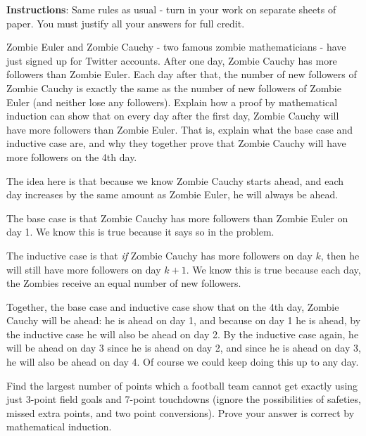 \documentclass[11pt]{exam}
\begin{document}
\noindent \textbf{Instructions}: Same rules as usual - turn in your work on separate sheets of paper.  You must justify all your answers for full credit.

\begin{questions}
\question[6] Zombie Euler and Zombie Cauchy - two famous zombie mathematicians - have just signed up for Twitter accounts.  After one day, Zombie Cauchy has more followers than Zombie Euler.  Each day after that, the number of new followers of Zombie Cauchy is exactly the same as the number of new followers of Zombie Euler (and neither lose any followers).  Explain how a proof by mathematical induction can show that on every day after the first day, Zombie Cauchy will have more followers than Zombie Euler.  That is, explain what the base case and inductive case are, and why they together prove that Zombie Cauchy will have more followers on the 4th day.

\begin{solution}
  The idea here is that because we know Zombie Cauchy starts ahead, and each day increases by the same amount as Zombie Euler, he will always be ahead.
  
   The base case is that Zombie Cauchy has more followers than Zombie Euler on day 1.  We know this is true because it says so in the problem.
    
    The inductive case is that {\em if} Zombie Cauchy has more followers on day $k$, then he will still have more followers on day $k+1$.  We know this is true because each day, the Zombies receive an equal number of new followers. 
    
    Together, the base case and inductive case show that on the 4th day, Zombie Cauchy will be ahead: he is ahead on day 1, and because on day 1 he is ahead, by the inductive case he will also be ahead on day 2.  By the inductive case again, he will be ahead on day 3 since he is ahead on day 2, and since he is ahead on day 3, he will also be ahead on day 4.  Of course we could keep doing this up to any day.
\end{solution}


\question[8] Find the largest number of points which a football team cannot get exactly using just 3-point field goals and 7-point touchdowns (ignore the possibilities of safeties, missed extra points, and two point conversions).  Prove your answer is correct by mathematical induction.


\end{questions}
\end{document}
